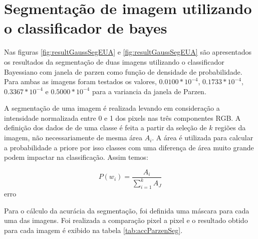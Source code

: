 \documentclass[ 
	article,			%
	11pt,				%
	oneside,			%
	a4paper,			%
	english,			%
	brazil,				%
	]{abntex2}
\begin{document}
\section{Segmentação de imagem utilizando o classificador de bayes} 
Nas figuras \ref{fig:resultGaussSegEUA} e \ref{fig:resultGaussSegEUA}
são apresentados os resultados da segmentação de duas imagens utilizando o
classificador Bayessiano com janela de parzen como função de densidade de
probabilidade. Para ambas as imagens foram testados os valores,
$0.0100*10^{-4}$, $0.1733*10^{-4}$, $0.3367*10^{-4}$ e $0.5000*10^{-4}$ para a
variancia da janela de Parzen.


A segmentação de uma imagem é realizada levando em
consideração a intensidade normalizada entre 0 e 1 dos pixels nas três
componentes RGB.
A definição dos dados de de uma classe é feita a partir da seleção de $k$
regiões da imagem, não necessariamente de mesma área $A_i$. A área é utilizada
para calcular a probabilidade a priore por isso classes com uma diferença de
área muito grande podem impactar na classificação.
Assim temos:

\begin{equation}
	P(w_i) =  \frac{A_i}{\sum_{i=1}^{k}{A_J}}
\end{equation}erro

Para o cálculo da acurácia da segmentação, foi definida uma máscara para cada
uma das imagens. Foi realizada a comparação pixel a pixel e o resultado obtido
para cada imagem é exibido na tabela \ref{tab:accParzenSeg}.
\end{document}
